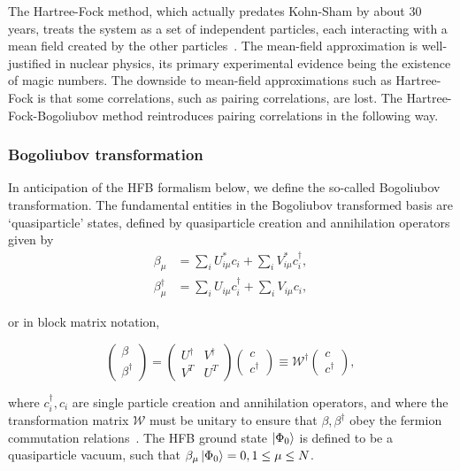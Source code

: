 The Hartree-Fock method, which actually predates Kohn-Sham by about 30 years, treats the system as a set of independent particles, each interacting with a mean field created by the other particles~\cite{Ring1980}. The mean-field approximation is well-justified in nuclear physics, its primary experimental evidence being the existence of magic numbers. The downside to mean-field approximations such as Hartree-Fock is that some correlations, such as pairing correlations, are lost. The Hartree-Fock-Bogoliubov method reintroduces pairing correlations in the following way.

\subsubsection{Bogoliubov transformation}

In anticipation of the HFB formalism below, we define the so-called Bogoliubov transformation. The fundamental entities in the Bogoliubov transformed basis are `quasiparticle' states, defined by quasiparticle creation and annihilation operators given by
\begin{align}
\beta_\mu &= \sum_i U^*_{i\mu}c_i + \sum_i V^*_{i\mu}c_i^\dagger, \\
\beta_\mu^\dagger &= \sum_i U_{i\mu}c_i^\dagger + \sum_i V_{i\mu}c_i,
\end{align}

\noindent or in block matrix notation,

\begin{equation}
\left(\begin{array}{c} \beta \\ \beta^\dagger\end{array}\right) = 
\left(\begin{array}{cc} U^\dagger & V^\dagger \\ V^T & U^T \end{array}\right)
\left(\begin{array}{c} c \\ c^\dagger\end{array}\right)
\equiv \mathcal{W}^\dagger \left(\begin{array}{c} c \\ c^\dagger\end{array}\right),
\end{equation}

\noindent where $c_i^\dagger, c_i$ are single particle creation and annihilation operators, and where the transformation matrix $\mathcal{W}$ must be unitary to ensure that $\beta, \beta^\dagger$ obey the fermion commutation relations~\cite{Ring1980}. The HFB ground state $\ket{\Phi_0}$ is defined to be a quasiparticle vacuum, such that $\beta_\mu\ket{\Phi_0}=0, 1\leq\mu\leq N$.

